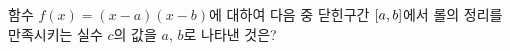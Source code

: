 함수 $f(x)=(x-a)(x-b)$에 대하여 다음 중 닫힌구간 $[a{,}\mkern3mu\mathopen{}b]$에서 롤의 정리를 만족시키는 실수 $c$의 값을 $a$, $b$로 나타낸 것은?
